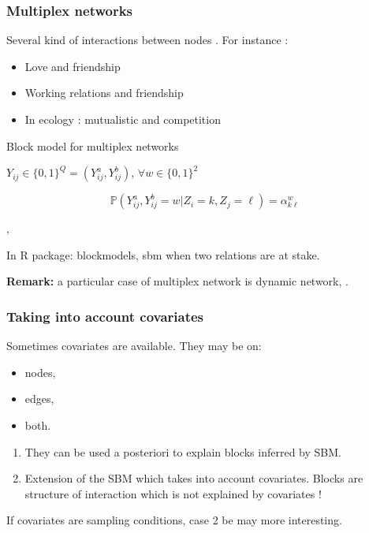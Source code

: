 \documentclass[compress,10pt]{beamer}
\begin{document}
\begin{frame} \frametitle{Multiplex networks}
Several kind of interactions between nodes . 
For instance : 


\begin{itemize}
\item Love and friendship
\item Working relations and friendship
\item  In ecology : mutualistic and competition
\end{itemize}


\begin{block}{Block model for multiplex networks}

$Y_{ij} \in \{0,1\} ^ Q = (Y_{ij}^a, Y_{ij}^b)$, $\forall w \in \{0,1\}^2$ 



$$\mathbb{P}(Y^a_{ij},Y^b_{ij} = w  | Z_i  = k, Z_j = \ell)  = \alpha^w _{k\ell}$$

\end{block}

\textcolor{mygreen}{
\cite{kefi}, \cite{barbillon2017stochastic}}

In \textcolor{mygreen}{R package: blockmodels, sbm} when two relations are at stake.
 

 \textbf{Remark:} a particular case of multiplex network is dynamic network, \textcolor{mygreen}{\cite{matias2017statistical}}.
 

 \end{frame}
\begin{frame} \frametitle{Taking into account covariates}
 Sometimes covariates are available. They may be on:
 \begin{itemize}
  \item nodes,
  \item edges,
  \item both.
 \end{itemize}

 
 
 \begin{enumerate}
  \item They can be used a posteriori to explain blocks inferred by SBM.
  \item Extension of the SBM which takes into account covariates. Blocks are structure of interaction which is not 
  explained by covariates !

 \end{enumerate}


 If covariates are sampling conditions, case 2  be  may more interesting.
 
\end{frame}
\end{document}
